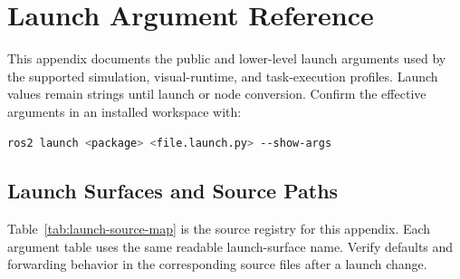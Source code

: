 \chapter{Launch Argument Reference}
\label{app:launch}

This appendix documents the public and lower-level launch arguments used by the
supported simulation, visual-runtime, and task-execution profiles. Launch
values remain strings until launch or node conversion. Confirm the effective
arguments in an installed workspace with:

\begin{lstlisting}[language=bash]
ros2 launch <package> <file.launch.py> --show-args
\end{lstlisting}

\section{Launch Surfaces and Source Paths}

Table~\ref{tab:launch-source-map} is the source registry for this appendix.
Each argument table uses the same readable launch-surface name. Verify defaults
and forwarding behavior in the corresponding source files after a launch
change.

